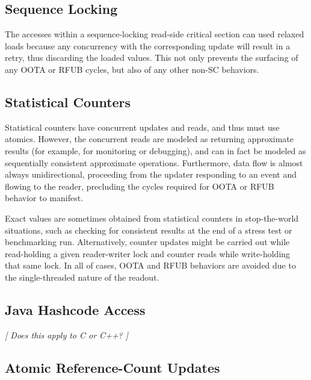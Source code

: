 \documentclass[10]{article}
\begin{document}

\subsection{Sequence Locking}
\label{sec:Sequence Locking}

The accesses within a sequence-locking read-side critical section can
used relaxed loads because any concurrency with the corresponding
update will result in a retry, thus discarding the loaded values.
This not only prevents the surfacing of any OOTA or RFUB cycles, but
also of any other non-SC behaviors.

\subsection{Statistical Counters}
\label{sec:Statistical Counters}

Statistical counters have concurrent updates and reads, and thus must
use atomics.
However, the concurrent reads are modeled as returning approximate results
(for example, for monitoring or debugging),
and can in fact be modeled as sequentially consistent approximate
operations.
Furthermore, data flow is almost always unidirectional, proceeding from
the updater responding to an event and flowing to the reader, precluding
the cycles required for OOTA or RFUB behavior to manifest.

Exact values are sometimes obtained from statistical counters in
stop-the-world situations, such as checking for consistent results
at the end of a stress test or benchmarking run.
Alternatively, counter updates might be carried out while read-holding
a given reader-writer lock and counter reads while write-holding
that same lock.
In all of cases, OOTA and RFUB behaviors are avoided due to the
single-threaded nature of the readout.

\subsection{Java Hashcode Access}
\label{sec:Java Hashcode Access}

\emph{[ Does this apply to C or C++? ]}

\subsection{Atomic Reference-Count Updates}
\label{sec:Atomic Reference-Count Updates}
\end{document}
